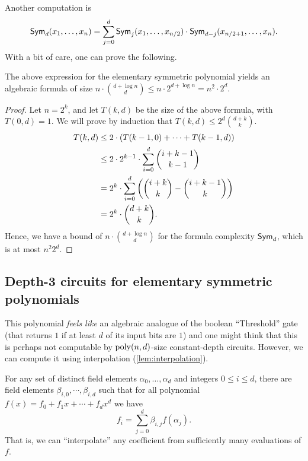 \noindent
Another computation is 
\[
\operatorname{\mathsf{Sym}}_{d}(x_1,\ldots, x_n) = \sum_{j=0}^d \operatorname{\mathsf{Sym}}_{j}(x_1,\ldots, x_{n/2}) \cdot \operatorname{\mathsf{Sym}}_{d-j}(x_{n/2 + 1},\ldots, x_{n}).
\]
With a bit of care, one can prove the following. 

\begin{lemma}
The above expression for the elementary symmetric polynomial yields an algebraic formula of size $n \cdot \binom{d + \log n}{d} \leq n \cdot 2^{d + \log n} = n^2 \cdot 2^d$. 
\end{lemma}
\begin{proof}
Let $n = 2^k$, and let $T(k,d)$ be the size of the above formula, with $T(0,d) = 1$. We will prove by induction that $T(k,d) \leq 2^d \binom{d + k}{k}$. 
\begin{align*}
T(k, d) & \leq 2 \cdot (T(k-1,0) + \cdots + T(k-1,d))\\
        & \leq 2 \cdot 2^{k-1} \cdot \sum_{i=0}^d \binom{i + k-1}{k-1}\\
        & = 2^k \cdot \sum_{i=0}^d \left(\binom{i + k}{k} - \binom{i + k-1}{k}\right)\\
        & = 2^k \cdot \binom{d + k}{k}.
\end{align*}
Hence, we have a bound of $n \cdot \binom{d + \log n}{d}$ for the formula complexity $\operatorname{\mathsf{Sym}}_d$, which is at most $n^2 2^d$. 
\end{proof}

\subsection{Depth-3 circuits for elementary symmetric polynomials}

This polynomial \emph{feels like} an algebraic analogue of the boolean ``Threshold'' gate (that returns $1$ if at least $d$ of its input bits are $1$) and one might think that this is perhaps not computable by $\operatorname{poly}(n,d)$-size constant-depth circuits. However, we can compute it using interpolation (\cref{lem:interpolation}). 

\begin{lemma*} For any set of distinct field elements $\alpha_0, \ldots, \alpha_d$ and integers $0 \leq i \leq d$, there are field elements $\beta_{i,0}, \cdots, \beta_{i,d}$ such that for all polynomial $f(x) = f_0 + f_1 x + \cdots + f_d x^d$ we have
  \[
  f_i = \sum_{j=0}^d \beta_{i,j} f(\alpha_j).
  \]
  That is, we can ``interpolate'' any coefficient from sufficiently many evaluations of $f$. 
\end{lemma*}

